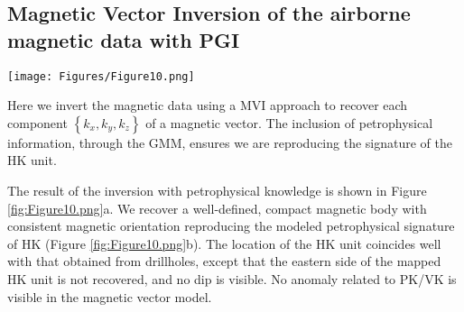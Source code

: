 \documentclass[paper, twocolumn]{geophysics} %
\begin{document}

\subsection{Magnetic Vector Inversion of the airborne magnetic data with PGI}



\begin{figure*}%
\centering
\texttt{[image: Figures/Figure10.png]}
\caption{Result of the petrophysically guided MVI. (a) Plan map, East-West, and North-South cross-sections through the magnetic vector model along each plane. The dotted line represents the location of each cross-section. The dark arrows represent the magnetization direction and strength; (b) Comparison between the petrophysical GMM (contour plots) used to constrain the magnetic vector model and the recovered magnetic vector model (scatter plots). The background unit appears in the plots as the small ellipsoid. Background cells are all within that small portion of the parameter-space. The geological identification is used to color the background of the plot.}
\label{fig:Figure10.png}
\end{figure*}%

Here we invert the magnetic data using a MVI approach to recover each component $\left\{k_x,k_y,k_z\right\}$ of a magnetic vector. The inclusion of petrophysical information, through the GMM, ensures we are reproducing the signature of the HK unit.

The result of the inversion with petrophysical knowledge is shown in Figure \ref{fig:Figure10.png}a. We recover a well-defined, compact magnetic body with consistent magnetic orientation reproducing the modeled petrophysical signature of HK (Figure \ref{fig:Figure10.png}b). The location of the HK unit coincides well with that obtained from drillholes, except that the eastern side of the mapped HK unit is not recovered, and no dip is visible. No anomaly related to PK/VK is visible in the magnetic vector model.
\end{document}
